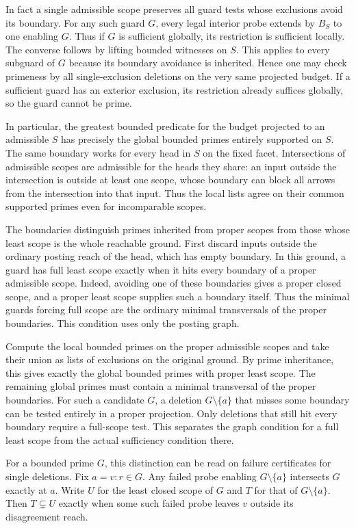 In fact a single admissible scope preserves
all guard tests whose exclusions avoid its
boundary. For any such guard $G$, every legal
interior probe extends by $B_S$ to one
enabling $G$. Thus if $G$ is sufficient
globally, its restriction is sufficient
locally. The converse follows by lifting
bounded witnesses on $S$. This applies to
every subguard of $G$ because its boundary
avoidance is inherited. Hence one may check
primeness by all single-exclusion deletions
on the very same projected budget. If a
sufficient guard has an exterior exclusion,
its restriction already suffices globally,
so the guard cannot be prime.

In particular, the greatest bounded predicate
for the budget projected to an admissible $S$
has precisely the global bounded primes
entirely supported on $S$. The same boundary works for every
head in $S$ on the fixed facet. Intersections
of admissible scopes are admissible for the
heads they share: an input outside the
intersection is outside at least one scope,
whose boundary can block all arrows from
the intersection into that input. Thus the
local lists agree on their common supported
primes even for incomparable scopes.

The boundaries distinguish primes inherited from
proper scopes from those whose least scope is
the whole reachable ground. First discard inputs
outside the ordinary posting reach of the head,
which has empty boundary. In this ground, a
guard has full least scope exactly when it hits
every boundary of a proper admissible scope.
Indeed, avoiding one of these boundaries gives
a proper closed scope, and a proper least
scope supplies such a boundary itself. Thus the
minimal guards forcing full scope are the
ordinary minimal transversals of the proper
boundaries. This condition uses only the
posting graph.

Compute the local bounded primes on the proper
admissible scopes and take their union as lists
of exclusions on the original ground. By prime
inheritance, this gives exactly the global
bounded primes with proper least scope. The
remaining global primes must contain a
minimal transversal of the proper boundaries.
For such a candidate $G$, a deletion
$G\setminus\{a\}$ that misses some boundary
can be tested entirely in a proper projection.
Only deletions that still hit every boundary
require a full-scope test. This separates the
graph condition for a full least scope from
the actual sufficiency condition there.

For a bounded prime $G$, this distinction can
be read on failure certificates for single
deletions. Fix $a=v:r\in G$. Any failed probe
enabling $G\setminus\{a\}$ intersects $G$
exactly at $a$.
Write $U$ for the least closed scope of $G$
and $T$ for that of $G\setminus\{a\}$.
Then $T\subsetneq U$ exactly when some such
failed probe leaves $v$ outside its
disagreement reach.


